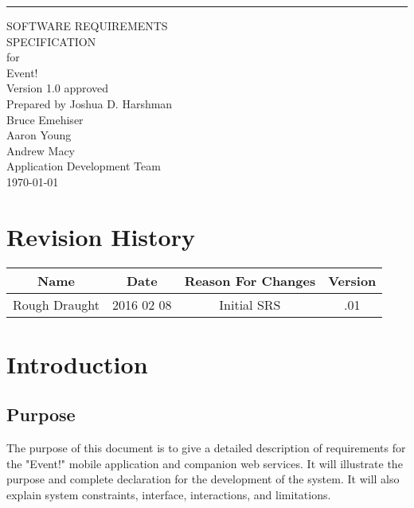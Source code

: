 \documentclass{scrreprt}
\date{}
\def\myversion{1.0 }
\begin{document}
\begin{flushright}
    \rule{16cm}{5pt}\vskip1cm
    \begin{bfseries}
        \Huge{SOFTWARE REQUIREMENTS\\ SPECIFICATION}\\
        \vspace{1.9cm}
        for\\
        \vspace{1.9cm}
        Event!\\
        \vspace{1.9cm}
        \LARGE{Version \myversion approved}\\
        \vspace{1.9cm}
        Prepared by Joshua D. Harshman\\Bruce Emehiser\\Aaron Young\\Andrew Macy\\
        \vspace{1.9cm}
        Application Development Team\\
        \vspace{1.9cm}
        \today\\
    \end{bfseries}
\end{flushright}

\tableofcontents


\chapter*{Revision History}

\begin{center}
    \begin{tabular}{|c|c|c|c|}
        \hline
	    Name & Date & Reason For Changes & Version\\
        \hline
	    Rough Draught & 2016 02 08 & Initial SRS & .01\\
        \hline
    \end{tabular}
\end{center}

\chapter{Introduction}

\section{Purpose}
The purpose of this document is to give a detailed description of requirements for
the "Event!" mobile application and companion web services. It will illustrate the purpose
and complete declaration for the development of the system.  It will also explain system
constraints, interface, interactions, and limitations. 
\end{document}
